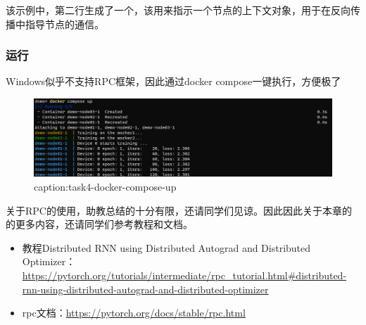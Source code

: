 该示例中，第二行生成了一个，该用来指示一个节点的上下文对象，用于在反向传播中指导节点的通信。

\subsubsection{运行}

Windows似乎不支持RPC框架，因此通过docker compose一键执行，方便极了~


\begin{figure}[htbp]
	\centering
	\includegraphics[width=1\textwidth]{figures/task4-docker-compose-up.png}
	\caption{caption:task4-docker-compose-up}
	\label{fig:task4-docker-compose-up}
\end{figure}


关于RPC的使用，助教总结的十分有限，还请同学们见谅。因此因此关于本章的的更多内容，还请同学们参考教程和文档。

\begin{itemize}
    \item 教程Distributed RNN using Distributed Autograd and Distributed Optimizer：\url{https://pytorch.org/tutorials/intermediate/rpc_tutorial.html#distributed-rnn-using-distributed-autograd-and-distributed-optimizer}
    \item rpc文档：\url{https://pytorch.org/docs/stable/rpc.html}
\end{itemize}





